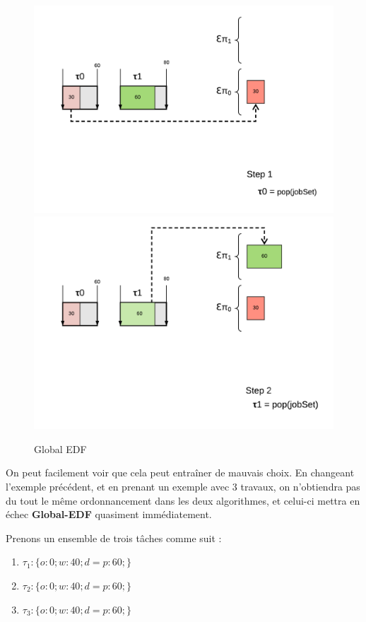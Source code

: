 	
	\begin{figure}[H]
		\includegraphics[scale=0.5]{img/gedf/gedf}
		\includegraphics[scale=0.5]{img/gedf/gedf2}
		\caption{Global EDF}
	\end{figure}
	 
	On peut facilement voir que cela peut entraîner de \og{}mauvais choix\fg{}. 
	En changeant l'exemple précédent, et en prenant un exemple avec 3 travaux, 
	on n'obtiendra pas du tout le même ordonnancement dans les deux algorithmes, 
	et celui-ci mettra en échec \textbf{Global-EDF} quasiment immédiatement.\newline
	
	Prenons un ensemble de trois tâches comme suit :

	\begin{enumerate}
		\setlength\itemsep{0.1em}
		\item $\tau_1 : \{o:0; w:40; d=p:60;\}$
		\item $\tau_2 : \{o:0; w:40; d=p:60;\}$
		\item $\tau_3 : \{o:0; w:40; d=p:60;\}$
	\end{enumerate}
	
